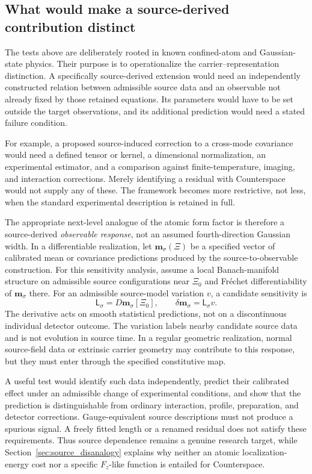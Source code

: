\documentclass[11pt,a4paper]{article}
\theoremstyle{definition}
\theoremstyle{remark}
\begin{document}
\subsection{What would make a source-derived contribution distinct}
\label{sec:source_observable}
The tests above are deliberately rooted in known confined-atom and Gaussian-state physics. Their purpose is to operationalize the carrier--representation distinction. A specifically source-derived extension would need an independently constructed relation between admissible source data and an observable not already fixed by those retained equations. Its parameters would have to be set outside the target observations, and its additional prediction would need a stated failure condition.\cite{foundation,planck}

For example, a proposed source-induced correction to a cross-mode covariance would need a defined tensor or kernel, a dimensional normalization, an experimental estimator, and a comparison against finite-temperature, imaging, and interaction corrections. Merely identifying a residual with Counterspace would not supply any of these. The framework becomes more restrictive, not less, when the standard experimental description is retained in full.

The appropriate next-level analogue of the atomic form factor is therefore a source-derived \emph{observable response}, not an assumed fourth-direction Gaussian width. In a differentiable realization, let $\boldsymbol m_\sigma(\Xi)$ be a specified vector of calibrated mean or covariance predictions produced by the source-to-observable construction. For this sensitivity analysis, assume a local Banach-manifold structure on admissible source configurations near $\Xi_0$ and Fr\'echet differentiability of $\boldsymbol m_\sigma$ there. For an admissible source-model variation $v$, a candidate sensitivity is
\[
 \mathsf L_\sigma=D\boldsymbol m_\sigma[\Xi_0],
 \qquad \delta\boldsymbol m_\sigma=\mathsf L_\sigma v.
\]
The derivative acts on smooth statistical predictions, not on a discontinuous individual detector outcome. The variation labels nearby candidate source data and is not evolution in source time. In a regular geometric realization, normal source-field data or extrinsic carrier geometry may contribute to this response, but they must enter through the specified constitutive map.\cite{foundation}

A useful test would identify such data independently, predict their calibrated effect under an admissible change of experimental conditions, and show that the prediction is distinguishable from ordinary interaction, profile, preparation, and detector corrections. Gauge-equivalent source descriptions must not produce a spurious signal. A freely fitted length or a renamed residual does not satisfy these requirements. Thus source dependence remains a genuine research target, while Section~\ref{sec:source_disanalogy} explains why neither an atomic localization-energy cost nor a specific $F_z$-like function is entailed for Counterspace.\cite{foundation,planck}
\end{document}
